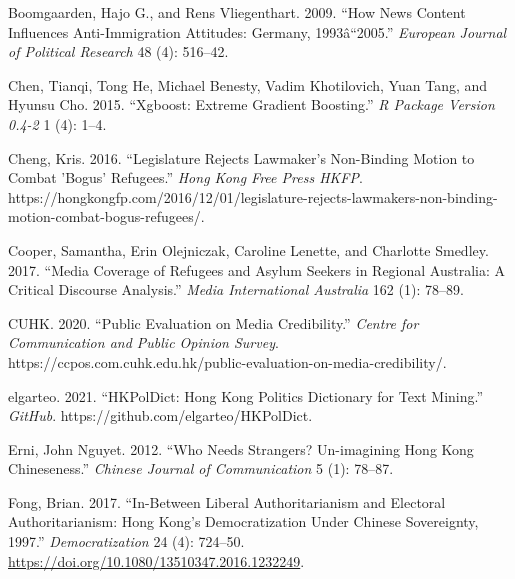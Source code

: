 \documentclass[a4paper, oneside]{report}
\begin{document}
\hypertarget{refs}{}
\begin{CSLReferences}{1}{0}
\leavevmode{}%
Boomgaarden, Hajo G., and Rens Vliegenthart. 2009. {``How News Content
Influences Anti-Immigration Attitudes: {Germany},
1993â\texteuro ``2005.''} \emph{European Journal of Political Research}
48 (4): 516--42.

\leavevmode{}%
Chen, Tianqi, Tong He, Michael Benesty, Vadim Khotilovich, Yuan Tang,
and Hyunsu Cho. 2015. {``Xgboost: Extreme Gradient Boosting.''} \emph{R
Package Version 0.4-2} 1 (4): 1--4.

\leavevmode{}%
Cheng, Kris. 2016. {``Legislature Rejects Lawmaker's Non-Binding Motion
to Combat 'Bogus' Refugees.''} \emph{Hong Kong Free Press HKFP}.
https://hongkongfp.com/2016/12/01/legislature-rejects-lawmakers-non-binding-motion-combat-bogus-refugees/.

\leavevmode{}%
Cooper, Samantha, Erin Olejniczak, Caroline Lenette, and Charlotte
Smedley. 2017. {``Media Coverage of Refugees and Asylum Seekers in
Regional {Australia}: {A} Critical Discourse Analysis.''} \emph{Media
International Australia} 162 (1): 78--89.

\leavevmode{}%
CUHK. 2020. {``Public {Evaluation} on {Media Credibility}.''}
\emph{Centre for Communication and Public Opinion Survey}.
https://ccpos.com.cuhk.edu.hk/public-evaluation-on-media-credibility/.

\leavevmode{}%
elgarteo. 2021. {``{HKPolDict}: {Hong Kong} Politics Dictionary for Text
Mining.''} \emph{GitHub}. https://github.com/elgarteo/HKPolDict.

\leavevmode{}%
Erni, John Nguyet. 2012. {``Who Needs Strangers? {Un-imagining Hong Kong
Chineseness}.''} \emph{Chinese Journal of Communication} 5 (1): 78--87.

\leavevmode{}%
Fong, Brian. 2017. {``In-Between Liberal Authoritarianism and Electoral
Authoritarianism: {Hong Kong}'s Democratization Under {Chinese}
Sovereignty, 1997.''} \emph{Democratization} 24 (4):
724--50. \url{https://doi.org/10.1080/13510347.2016.1232249}.


\end{CSLReferences}
\end{document}
